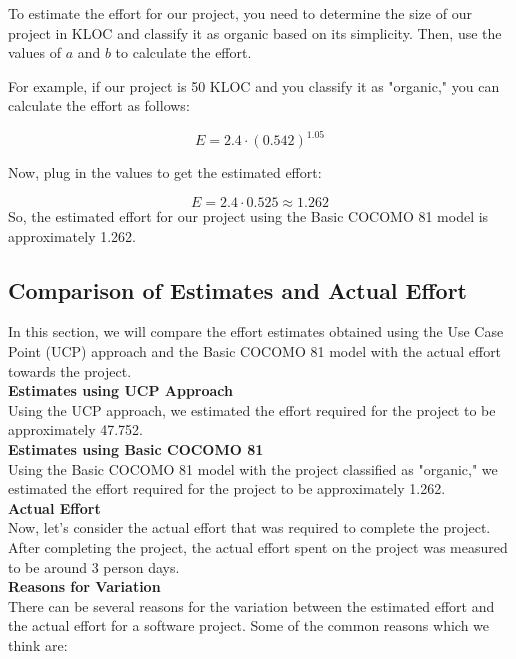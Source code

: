 \documentclass[runningheads]{llncs}
\begin{document}
To estimate the effort for our project, you need to determine the size of our project in KLOC and classify it as organic based on its simplicity. Then, use the values of \(a\) and \(b\) to calculate the effort.

For example, if our project is 50 KLOC and you classify it as "organic," you can calculate the effort as follows:

\[ E = 2.4 \cdot (0.542)^{1.05} \]

Now, plug in the values to get the estimated effort:

\[ E = 2.4 \cdot 0.525 \approx 1.262 \]
So, the estimated effort for our project using the Basic COCOMO 81 model is approximately 1.262.

\subsection{Comparison of Estimates and Actual Effort}
In this section, we will compare the effort estimates obtained using the Use Case Point (UCP) approach and the Basic COCOMO 81 model with the actual effort towards the project.\\

\textbf{Estimates using UCP Approach}\\
Using the UCP approach, we estimated the effort required for the project to be approximately 47.752.\\

\textbf{Estimates using Basic COCOMO 81}\\
Using the Basic COCOMO 81 model with the project classified as "organic," we estimated the effort required for the project to be approximately 1.262.\\

\textbf{Actual Effort}\\
Now, let's consider the actual effort that was required to complete the project. After completing the project, the actual effort spent on the project was measured to be around 3 person days.\\

\textbf{Reasons for Variation}\\
There can be several reasons for the variation between the estimated effort and the actual effort for a software project. Some of the common reasons which we think are:
\end{document}
